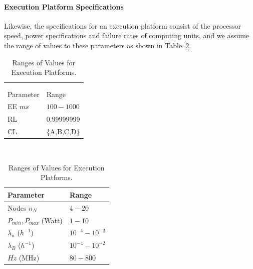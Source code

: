 \paragraph{Execution Platform Specifications}
Likewise, the specifications for an execution platform consist of the processor speed, power specifications and failure rates of computing units, and we assume the range of values to these parameters as shown in Table~\ref{tbl_execpla}.
\begin{table}
	\small
	\parbox{.4\linewidth}{
		\centering
		\begin{tabular}{@{}ll@{}}
			&\\&\\
			\toprule
			Parameter  			& Range\\ 
			\midrule
			EE $ms$					 	& $100-1000$\\
			RL 						& 0.99999999\\
			CL 						& \{A,B,C,D\}\\
			\bottomrule
		\end{tabular}
		\caption{Ranges of Values for Applications Requirements.}
		\label{tbl_app_ranges}
	}
~
	\parbox{.5\linewidth}{
		\centering\raggedbottom
		\begin{tabular}{@{}ll@{}}
			\toprule
			Parameter  		& Range\\ 
			\midrule
			Nodes $n_N$							& $4-20$\\
			$P_{min},P_{max}$ (Watt)	& $1-10$\\
			$\lambda_n$ ($h^{-1}$) 	& $10^{-4}-10^{-2}$\\
			$\lambda_B$ ($h^{-1}$) 	& $10^{-4}-10^{-2}$\\
			$Hz$ (MHz)			 	& $80-800$\\
			\bottomrule
		\end{tabular}
		\caption{Ranges of Values for Execution Platforms.}
		\label{tbl_execpla}
	}
\end{table}
